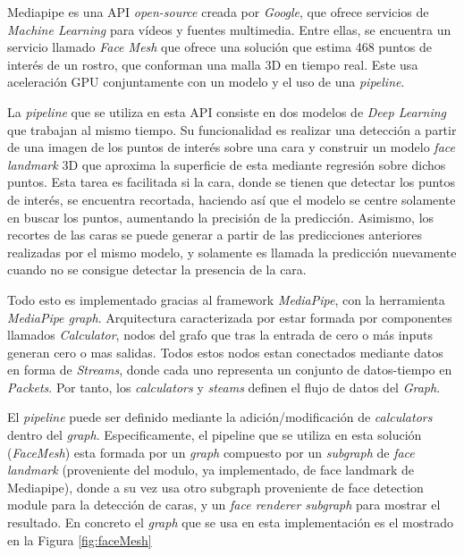 Mediapipe es una API \textit{open-source} creada por \textit{Google}, que ofrece servicios de \textit{Machine Learning} para vídeos y fuentes multimedia. Entre ellas, se encuentra un servicio llamado \textit{Face Mesh} que ofrece una solución que estima 468 puntos de interés de un rostro, que conforman una malla 3D en tiempo real. Este usa aceleración GPU conjuntamente con un modelo y el uso de una \textit{pipeline}.

La \textit{pipeline} que se utiliza en esta API consiste en dos modelos de \textit{Deep Learning} que trabajan al mismo tiempo. Su funcionalidad es realizar una detección a partir de una imagen de los puntos de interés sobre una cara y construir un modelo \textit{face landmark} 3D que aproxima la superficie de esta mediante regresión sobre dichos puntos. Esta tarea es facilitada si la cara, donde se tienen que detectar los puntos de interés, se encuentra recortada, haciendo así que el modelo se centre solamente en buscar los puntos, aumentando la precisión de la predicción. Asimismo, los recortes de las caras se puede generar a partir de las predicciones anteriores realizadas por el mismo modelo, y solamente es llamada la predicción nuevamente cuando no se consigue detectar la presencia de la cara.\cite{faceMesh}

Todo esto es implementado gracias al framework \textit{MediaPipe}, con la herramienta \textit{MediaPipe graph}. Arquitectura caracterizada por estar formada por componentes llamados \textit{Calculator}, nodos del grafo que tras la entrada de cero o más inputs generan cero o mas salidas. Todos estos nodos estan conectados mediante datos en forma de \textit{Streams}, donde cada uno representa un conjunto de datos-tiempo en \textit{Packets}. Por tanto, los \textit{calculators} y \textit{steams} definen el flujo de datos del \textit{Graph}. \cite{mediapipe}

El \textit{pipeline} puede ser definido mediante la adición/modificación de \textit{calculators} dentro del \textit{graph}. Especificamente, el pipeline que se utiliza en esta solución (\textit{FaceMesh}) esta formada por un \textit{graph} compuesto por un \textit{subgraph} de \textit{face landmark} (proveniente del modulo, ya implementado, de face landmark de Mediapipe), donde a su vez usa otro subgraph proveniente de face detection module para la detección de caras, y un \textit{face renderer subgraph} para mostrar el resultado. \cite{faceMesh} En concreto el \textit{graph} que se usa en esta implementación es el mostrado en la Figura \ref{fig:faceMesh}

